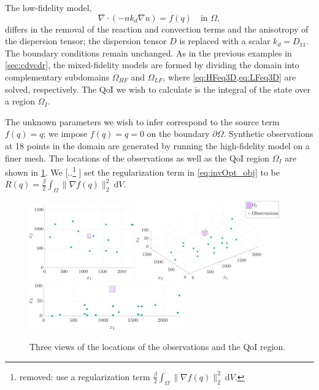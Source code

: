 \documentclass[review]{siamart0516}
\providecommand{\DIFaddtex}[1]{{\protect\color{blue} \sf #1}} %
\providecommand{\DIFdeltex}[1]{{\protect\color{red} [..\footnote{removed: #1} ]}} %
\providecommand{\DIFaddbegin}{} %
\providecommand{\DIFaddend}{} %
\providecommand{\DIFdelbegin}{} %
\providecommand{\DIFdelend}{} %
\providecommand{\DIFadd}[1]{\texorpdfstring{\DIFaddtex{#1}}{#1}} %
\providecommand{\DIFdel}[1]{\texorpdfstring{\DIFdeltex{#1}}{}} %
\newcommand{\DIFscaledelfig}{0.5}
\newlength{\DIFdelgraphicswidth} %
\newlength{\DIFdelgraphicsheight} %
\newcommand{\DIFaddincludegraphics}[2][]{{\color{blue}\fbox{\DIFOincludegraphics[#1]{#2}}}} %
\newcommand{\DIFdelincludegraphics}[2][]{%
\sbox{\DIFdelgraphicsbox}{\DIFOincludegraphics[#1]{#2}}%
\settoboxwidth{\DIFdelgraphicswidth}{\DIFdelgraphicsbox} %
\settoboxtotalheight{\DIFdelgraphicsheight}{\DIFdelgraphicsbox} %
\scalebox{\DIFscaledelfig}{%
\parbox[b]{\DIFdelgraphicswidth}{\usebox{\DIFdelgraphicsbox}\\[-\baselineskip] \rule{\DIFdelgraphicswidth}{0em}}\llap{\resizebox{\DIFdelgraphicswidth}{\DIFdelgraphicsheight}{%
\setlength{\unitlength}{\DIFdelgraphicswidth}%
\begin{picture}(1,1)%
\thicklines\linethickness{2pt} %
{\color[rgb]{1,0,0}\put(0,0){\framebox(1,1){}}}%
{\color[rgb]{1,0,0}\put(0,0){\line( 1,1){1}}}%
{\color[rgb]{1,0,0}\put(0,1){\line(1,-1){1}}}%
\end{picture}%
}\hspace*{3pt}}} %
} %
\DeclareRobustCommand{\DIFaddbegin}{\DIFOaddbegin \let\includegraphics\DIFaddincludegraphics} %
\DeclareRobustCommand{\DIFaddend}{\DIFOaddend \let\includegraphics\DIFOincludegraphics} %
\DeclareRobustCommand{\DIFdelbegin}{\DIFOdelbegin \let\includegraphics\DIFdelincludegraphics} %
\DeclareRobustCommand{\DIFdelend}{\DIFOaddend \let\includegraphics\DIFOincludegraphics} %
\begin{document}
The low-fidelity model,
%
\begin{equation}
\nabla\cdot(- nk_d\nabla u) = f(q) \quad \text{in } \Omega, \label{eq:LFeq3D}
\end{equation}
%
differs in the removal of the reaction and convection terms and the anisotropy of the dispersion tensor; the dispersion tensor $D$ is replaced with a scalar $k_d=D_{11}$. The boundary conditions remain unchanged. As in the previous examples in \cref{sec:cdvcdr}, the mixed-fidelity models are formed by dividing the domain into complementary subdomains $\Omega_{HF}$ and $\Omega_{LF}$, where \cref{eq:HFeq3D,eq:LFeq3D} are solved, respectively. The QoI we wish to calculate is the integral of the state over a region $\Omega_I$.

The unknown parameters we wish to infer correspond to the source term $f(q)=q$; we impose $f(q)=q=0$ on the boundary $\partial\Omega$. Synthetic observations at 18 points in the domain are generated by running the high-fidelity model on a finer mesh. The locations of the observations as well as the QoI region $\Omega_I$ are shown in \cref{fig:setup3D}. We \DIFdelbegin \DIFdel{use a regularization term $\frac{\beta}{2}\int_\Omega \|\nabla f(q)\|_2^2\:\textrm{d}V$.
}\DIFdelend \DIFaddbegin \DIFadd{set the regularization term in }\cref{eq:invOpt_obj} \DIFadd{to be $R(q)=\frac{\beta}{2}\int_\Omega \|\nabla f(q)\|_2^2\:\textrm{d}V$.
}\DIFaddend %
\begin{figure}[htbp]
\centering
\includegraphics[width=0.4\textwidth]{series3D/setup_aerial_nolegend.pdf} \hfill
\includegraphics[width=0.55\textwidth]{series3D/setup_3view.pdf} \\
\vspace{\baselineskip}
\includegraphics[width=0.6\textwidth]{series3D/setup_side_view.pdf}
\caption{Three views of the locations of the observations and the QoI region.}
\label{fig:setup3D}
\end{figure}
%
\end{document}
